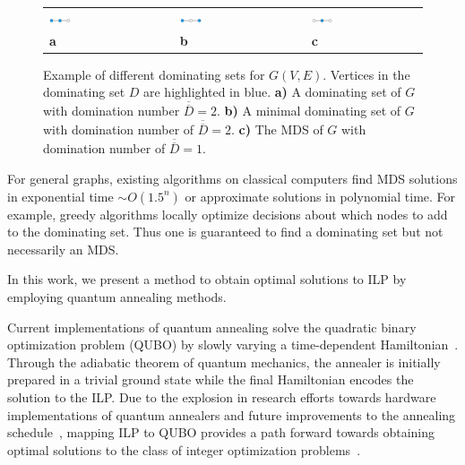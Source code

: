 \documentclass[10pt]{iopart}
\begin{document}
\begin{figure}
	\centering
	\begin{tabular}{p{}p{}p{}p{}p{}}
	\includegraphics[width=0.2\textwidth]{./new_figures/MDS_mds0.pdf}
&&
	\includegraphics[width=0.2\textwidth]{./new_figures/MDS_mds1.pdf}
&&
	\includegraphics[width=0.2\textwidth]{./new_figures/MDS_mds2.pdf}\\
	\centering\textbf{a} && \centering\textbf{b} && \centering\textbf{c}
	\end{tabular}
	\caption{Example of different dominating sets for $G(V, E)$. Vertices in the dominating set $D$ are highlighted in blue. {\textbf{a)}} A dominating set of $G$ with domination number $\overline{\overline{D}} = 2$. {\textbf{b)}} A minimal dominating set of $G$ with domination number of $\overline{\overline{D}} = 2$. {\textbf{c)}} The MDS of $G$ with domination number of $\overline{\overline{D}} = 1$.}
	\label{fig:dominating_sets}
\end{figure}

For general graphs, existing algorithms on classical computers find MDS solutions in exponential time $\sim O( 1.5^n)$ \cite{Fomin2009, vanRooij2009} or approximate solutions in polynomial time. For example, greedy algorithms locally optimize decisions about which nodes to add to the dominating set.
Thus one is guaranteed to find a dominating set but not necessarily an MDS.

In this work, we present a method to obtain optimal solutions to ILP by employing quantum annealing methods.

Current implementations of quantum annealing solve the quadratic binary optimization problem (QUBO) by slowly varying a time-dependent Hamiltonian~\cite{1998PhRvE..58.5355K, 2000quant.ph..1106F, RevModPhys.80.1061}.
Through the adiabatic theorem of quantum mechanics, the annealer is initially prepared in a trivial ground state while the final Hamiltonian encodes the solution to the ILP.
Due to the explosion in research efforts towards hardware implementations of quantum annealers and future improvements to the annealing schedule~\cite{doi:10.7566/JPSJ.89.044001}, mapping ILP to QUBO provides a path forward towards obtaining optimal solutions to the class of integer optimization problems~\cite{2018Glover}.
\end{document}
